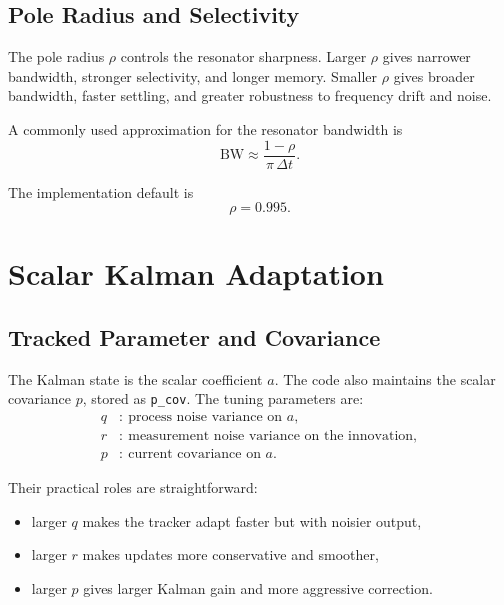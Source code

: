 \documentclass[conference]{IEEEtran}
\begin{document}
\subsection{Pole Radius and Selectivity}

The pole radius $\rho$ controls the resonator sharpness.
Larger $\rho$ gives narrower bandwidth, stronger selectivity, and longer
memory. Smaller $\rho$ gives broader bandwidth, faster settling, and greater
robustness to frequency drift and noise.

A commonly used approximation for the resonator bandwidth is
\begin{equation}
  \mathrm{BW} \approx \frac{1-\rho}{\pi\,\Delta t}.
\end{equation}

The implementation default is
\begin{equation}
  \rho = 0.995.
\end{equation}

\section{Scalar Kalman Adaptation}\label{sec:kalman}

\subsection{Tracked Parameter and Covariance}

The Kalman state is the scalar coefficient $a$. The code also maintains the
scalar covariance $p$, stored as \texttt{p\_cov}. The tuning parameters are:
\begin{align}
  q &:\ \text{process noise variance on } a,\\
  r &:\ \text{measurement noise variance on the innovation},\\
  p &:\ \text{current covariance on } a.
\end{align}

Their practical roles are straightforward:
\begin{itemize}[leftmargin=1.4em]
  \item larger $q$ makes the tracker adapt faster but with noisier output,
  \item larger $r$ makes updates more conservative and smoother,
  \item larger $p$ gives larger Kalman gain and more aggressive correction.
\end{itemize}
\end{document}
